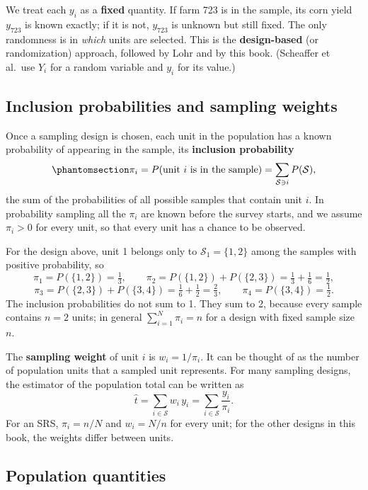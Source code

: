\documentclass[
  letterpaper,
  DIV=11,
  numbers=noendperiod]{scrreprt}
\renewcommand{\[}{\begin{equation}}
\renewcommand{\]}{\end{equation}}
\begin{document}
We treat each \(y_i\) as a \textbf{fixed} quantity. If farm 723 is in
the sample, its corn yield \(y_{723}\) is known exactly; if it is not,
\(y_{723}\) is unknown but still fixed. The only randomness is in
\emph{which} units are selected. This is the \textbf{design-based} (or
randomization) approach, followed by Lohr and by this book. (Scheaffer
et al.~use \(Y_i\) for a random variable and \(y_i\) for its value.)

\subsection{Inclusion probabilities and sampling
weights}\label{inclusion-probabilities-and-sampling-weights}

Once a sampling design is chosen, each unit in the population has a
known probability of appearing in the sample, its \textbf{inclusion
probability} \begin{equation}\protect\phantomsection\label{eq-include}{
\pi_i = P(\text{unit } i \text{ is in the sample}) = \sum_{\mathcal S \ni i} P(\mathcal S),
}\end{equation} the sum of the probabilities of all possible samples
that contain unit \(i\). In probability sampling all the \(\pi_i\) are
known before the survey starts, and we assume \(\pi_i > 0\) for every
unit, so that every unit has a chance to be observed.

For the design above, unit 1 belongs only to \(\mathcal S_1 = \{1,2\}\)
among the samples with positive probability, so \[
\pi_1 = P(\{1,2\}) = \tfrac13, \qquad
\pi_2 = P(\{1,2\})+P(\{2,3\}) = \tfrac13+\tfrac16=\tfrac12,
\] \[
\pi_3 = P(\{2,3\})+P(\{3,4\}) = \tfrac16+\tfrac12=\tfrac23, \qquad
\pi_4 = P(\{3,4\}) = \tfrac12 .
\] The inclusion probabilities do not sum to 1. They sum to 2, because
every sample contains \(n = 2\) units; in general
\(\sum_{i=1}^N \pi_i = n\) for a design with fixed sample size \(n\).

The \textbf{sampling weight} of unit \(i\) is \(w_i = 1/\pi_i\). It can
be thought of as the number of population units that a sampled unit
represents. For many sampling designs, the estimator of the population
total can be written as \[
\hat t = \sum_{i \in \mathcal{S}} w_i \, y_i = \sum_{i \in \mathcal{S}} \frac{y_i}{\pi_i}.
\] For an SRS, \(\pi_i = n/N\) and \(w_i = N/n\) for every unit; for the
other designs in this book, the weights differ between units.

\subsection{Population quantities}\label{population-quantities}
\end{document}

